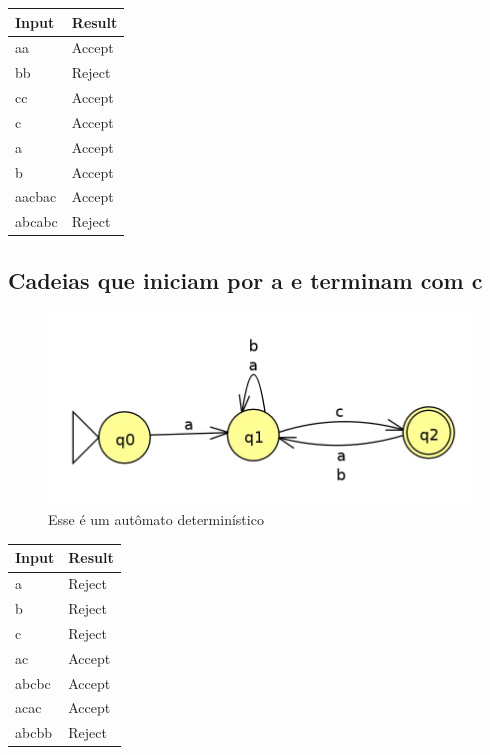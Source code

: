 \documentclass[11pt]{article}
\begin{document}
\begin{center}
\begin{tabular}{ll}
Input & Result\\
\hline
aa & Accept\\
bb & Reject\\
cc & Accept\\
c & Accept\\
a & Accept\\
b & Accept\\
aacbac & Accept\\
abcabc & Reject\\
\end{tabular}
\end{center}
\subsection{Cadeias que iniciam por a e terminam com c}
\label{sec:org59a865c}
\begin{figure}[htbp]
\centering
\includegraphics[width=.9\linewidth]{./q1/d/q1d.jpg}
\caption{\label{fig:orgd03888f}
Esse é um autômato determinístico}
\end{figure}

\begin{center}
\begin{tabular}{ll}
Input & Result\\
\hline
a & Reject\\
b & Reject\\
c & Reject\\
ac & Accept\\
abcbc & Accept\\
acac & Accept\\
abcbb & Reject\\
\end{tabular}
\end{center}
\end{document}
